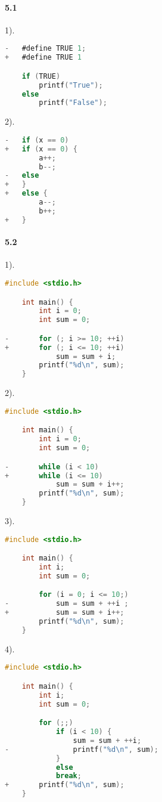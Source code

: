 \documentclass[UTF8]{ctexart}
\begin{document}
 

\pagestyle{main}
\paragraph{5.1\\}
1).
\begin{lstlisting}[language=C]
-   #define TRUE 1;
+   #define TRUE 1

    if (TRUE)
        printf("True");
    else
        printf("False");

\end{lstlisting}
2).
\begin{lstlisting}[language=C]
-   if (x == 0)
+   if (x == 0) {
        a++;
        b--;
-   else
+   }
+   else {
        a--;
        b++;
+   }
\end{lstlisting}
\paragraph{5.2\\}
1).
\begin{lstlisting}[language=C]
    #include <stdio.h>

    int main() {
        int i = 0;
        int sum = 0;

-       for (; i >= 10; ++i)
+       for (; i <= 10; ++i)
            sum = sum + i;
        printf("%d\n", sum);
    }
\end{lstlisting}
2).
\begin{lstlisting}[language=C]
    #include <stdio.h>

    int main() {
        int i = 0;
        int sum = 0;

-       while (i < 10)
+       while (i <= 10)
            sum = sum + i++;
        printf("%d\n", sum);
    }
\end{lstlisting}
3).
\begin{lstlisting}[language=C]
    #include <stdio.h>

    int main() {
        int i;
        int sum = 0;

        for (i = 0; i <= 10;)
-           sum = sum + ++i ;
+           sum = sum + i++;
        printf("%d\n", sum);
    }
\end{lstlisting}
4).
\begin{lstlisting}[language=C]
    #include <stdio.h>

    int main() {
        int i;
        int sum = 0;

        for (;;)
            if (i < 10) {
                sum = sum + ++i;
-               printf("%d\n", sum);
            }
            else
            break;
+       printf("%d\n", sum);
    }
\end{lstlisting}
\end{document}
